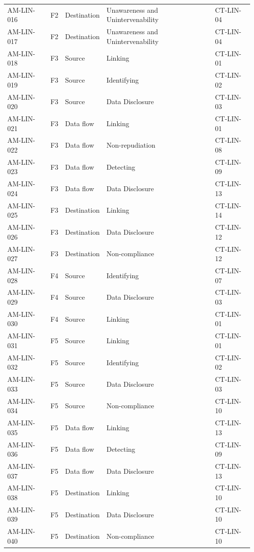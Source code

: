 \begin{footnotesize}
\begin{longtable}{l l p{} p{} l}
        AM-LIN-016 & F2 & Destination & Unawareness and Unintervenability & CT-LIN-04 \\
        AM-LIN-017 & F2 & Destination & Unawareness and Unintervenability & CT-LIN-04 \\
        AM-LIN-018 & F3 & Source & Linking & CT-LIN-01 \\
        AM-LIN-019 & F3 & Source & Identifying & CT-LIN-02 \\
        AM-LIN-020 & F3 & Source & Data Disclosure & CT-LIN-03 \\
        AM-LIN-021 & F3 & Data flow & Linking & CT-LIN-01 \\
        AM-LIN-022 & F3 & Data flow & Non-repudiation & CT-LIN-08 \\
        AM-LIN-023 & F3 & Data flow & Detecting & CT-LIN-09 \\
        AM-LIN-024 & F3 & Data flow & Data Disclosure & CT-LIN-13 \\
        AM-LIN-025 & F3 & Destination & Linking & CT-LIN-14 \\
        AM-LIN-026 & F3 & Destination & Data Disclosure & CT-LIN-12 \\
        AM-LIN-027 & F3 & Destination & Non-compliance & CT-LIN-12 \\
        AM-LIN-028 & F4 & Source & Identifying & CT-LIN-07 \\
        AM-LIN-029 & F4 & Source & Data Disclosure & CT-LIN-03 \\
        AM-LIN-030 & F4 & Source & Linking & CT-LIN-01 \\
        AM-LIN-031 & F5 & Source & Linking & CT-LIN-01 \\
        AM-LIN-032 & F5 & Source & Identifying & CT-LIN-02 \\
        AM-LIN-033 & F5 & Source & Data Disclosure & CT-LIN-03 \\
        AM-LIN-034 & F5 & Source & Non-compliance & CT-LIN-10 \\
        AM-LIN-035 & F5 & Data flow & Linking & CT-LIN-13 \\
        AM-LIN-036 & F5 & Data flow & Detecting & CT-LIN-09 \\
        AM-LIN-037 & F5 & Data flow & Data Disclosure & CT-LIN-13 \\
        AM-LIN-038 & F5 & Destination & Linking & CT-LIN-10 \\
        AM-LIN-039 & F5 & Destination & Data Disclosure & CT-LIN-10 \\
        AM-LIN-040 & F5 & Destination & Non-compliance & CT-LIN-10 \\

\end{longtable}
\end{footnotesize}
